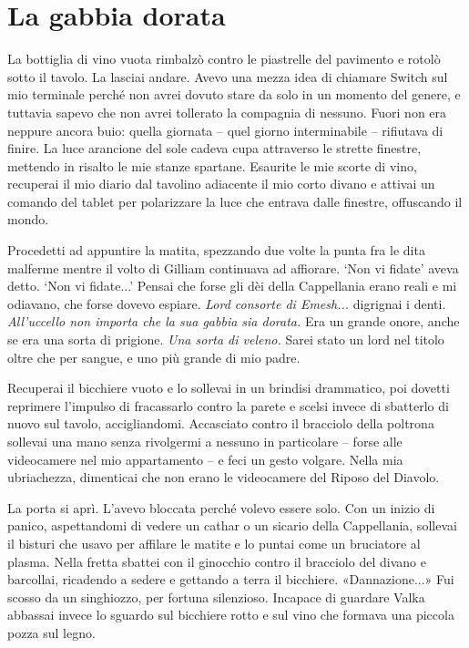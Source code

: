 \chapter{La gabbia dorata}

La bottiglia di vino vuota rimbalzò contro le piastrelle del pavimento e
rotolò sotto il tavolo. La lasciai andare. Avevo una mezza idea di
chiamare Switch sul mio terminale perché non avrei dovuto stare da solo
in un momento del genere, e tuttavia sapevo che non avrei tollerato la
compagnia di nessuno. Fuori non era neppure ancora buio: quella giornata
-- quel giorno interminabile -- rifiutava di finire. La luce arancione
del sole cadeva cupa attraverso le strette finestre, mettendo in risalto
le mie stanze spartane. Esaurite le mie scorte di vino, recuperai il mio
diario dal tavolino adiacente il mio corto divano e attivai un comando
del tablet per polarizzare la luce che entrava dalle finestre,
offuscando il mondo.

Procedetti ad appuntire la matita, spezzando due volte la punta fra le
dita malferme mentre il volto di Gilliam continuava ad affiorare. `Non
vi fidate' aveva detto. `Non vi fidate...' Pensai che forse gli dèi
della Cappellania erano reali e mi odiavano, che forse dovevo espiare.
\emph{Lord consorte di Emesh...} digrignai i denti. \emph{All'uccello
	non importa che la sua gabbia sia dorata.} Era un grande onore, anche se
era una sorta di prigione. \emph{Una sorta di veleno.} Sarei stato un
lord nel titolo oltre che per sangue, e uno più grande di mio padre.

Recuperai il bicchiere vuoto e lo sollevai in un brindisi drammatico,
poi dovetti reprimere l'impulso di fracassarlo contro la parete e scelsi
invece di sbatterlo di nuovo sul tavolo, accigliandomi. Accasciato
contro il bracciolo della poltrona sollevai una mano senza rivolgermi a
nessuno in particolare -- forse alle videocamere nel mio appartamento --
e feci un gesto volgare. Nella mia ubriachezza, dimenticai che non erano
le videocamere del Riposo del Diavolo.

La porta si aprì. L'avevo bloccata perché volevo essere solo. Con un
inizio di panico, aspettandomi di vedere un cathar o un sicario della
Cappellania, sollevai il bisturi che usavo per affilare le matite e lo
puntai come un bruciatore al plasma. Nella fretta sbattei con il
ginocchio contro il bracciolo del divano e barcollai, ricadendo a sedere
e gettando a terra il bicchiere. «Dannazione...» Fui scosso da un
singhiozzo, per fortuna silenzioso. Incapace di guardare Valka abbassai
invece lo sguardo sul bicchiere rotto e sul vino che formava una piccola
pozza sul legno.

